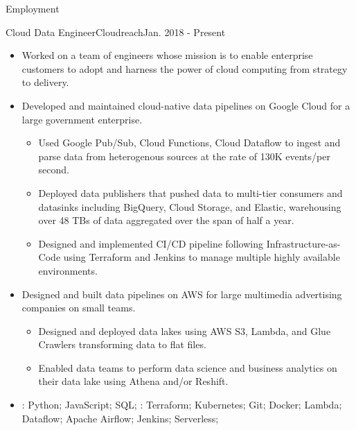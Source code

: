 \documentclass[]{mcdowellcv}
\begin{document}
    \makeheader

    \begin{cvsection}{Employment}


        \begin{cvsubsection}{Cloud Data Engineer}{Cloudreach}{Jan. 2018 - Present}
            \begin{itemize}
                \item Worked on a team of engineers whose mission is to enable enterprise customers to adopt and harness the power of cloud computing from strategy to delivery. 
                \item Developed and maintained cloud-native data pipelines on Google Cloud for a large government enterprise.
                    \begin{itemize}
                            \item Used Google Pub/Sub, Cloud Functions, Cloud Dataflow to ingest and parse data from heterogenous sources at the rate of 130K events/per second. 
                            \item Deployed data publishers that pushed data to multi-tier consumers and datasinks including BigQuery, Cloud Storage, and Elastic, warehousing over 48 TBs of data aggregated over the span of half a year. 
                            \item Designed and implemented CI/CD pipeline following Infrastructure-as-Code using Terraform and Jenkins to manage multiple highly available environments. 
                    \end{itemize}
                \end{itemize}
                \begin{itemize}
                    \item Designed and built data pipelines on AWS for large multimedia advertising companies on small teams.
                    \begin{itemize}
                        \item Designed and deployed data lakes using AWS S3, Lambda, and Glue Crawlers transforming data to flat files. 
                        \item Enabled data teams to perform data science and business analytics on their data lake using Athena and/or Reshift.
                    \end{itemize}
                \end{itemize}
            \begin{itemize}
                 \item {}: Python; JavaScript; SQL; \newline
                 : Terraform; Kubernetes; Git; Docker; Lambda; Dataflow; Apache Airflow; Jenkins; Serverless;
            \end{itemize}
        \end{cvsubsection}


\end{cvsection}
\end{document}

